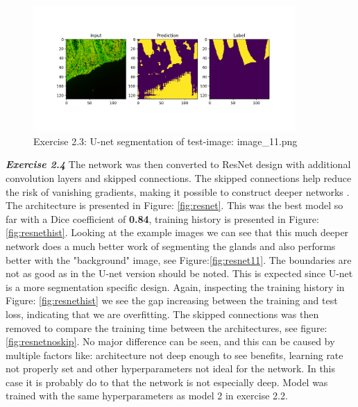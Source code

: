 \documentclass[a4paper,10pt]{article}
\begin{document}
\begin{figure}[ht!]
\centering
\includegraphics[width=100mm]{figures/assignment_3/segmentation_im11_unet.png}
\caption{Exercise 2.3: U-net segmentation of test-image: image\_11.png}
\label{fig:unet11}
\end{figure}

\newpage

\textit{\textbf{Exercise 2.4}}
The network was then converted to ResNet design with additional convolution layers and skipped connections. The skipped connections help reduce the risk of vanishing gradients, making it possible to construct deeper networks \cite{ResNet}. The architecture is presented in Figure: \ref{fig:resnet}. This was the best model so far with a Dice coefficient of \textbf{0.84}, training history is presented in Figure: \ref{fig:resnethist}. Looking at the example images we can see that this much deeper network does a much better work of segmenting the glands and also performs better with the "background" image, see Figure:\ref{fig:resnet11}. The boundaries are not as good as in the U-net version should be noted. This is expected since U-net is a more segmentation specific design. Again, inspecting the training history in Figure: \ref{fig:resnethist} we see the gap increasing between the training and test loss, indicating that we are overfitting. The skipped connections was then removed to compare the training time between the architectures, see figure: \ref{fig:resnetnoskip}. No major difference can be seen, and this can be caused by multiple factors like: architecture not deep enough to see benefits, learning rate not properly set and other hyperparameters not ideal for the network. In this case it is probably do to that the network is not especially deep. Model was trained with the same hyperparameters as model 2 in exercise 2.2. 
\end{document}
